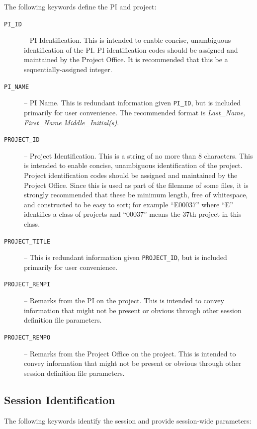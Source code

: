 The following keywords define the PI and project:

\begin{description}
\item[\texttt{PI\_ID}] -- PI Identification.  This is intended to enable concise, unambiguous identification of the PI.  PI identification codes should be assigned and maintained by the Project Office.  It is recommended that this be a sequentially-assigned integer.

\item[\texttt{PI\_NAME}] -- PI Name.  This is redundant information given \texttt{PI\_ID}, but is included primarily for user convenience.  The recommended format is \textit{Last\_Name, First\_Name Middle\_Initial(s)}.

\item[\texttt{PROJECT\_ID}] -- Project Identification.  This is a string of no more than 8 characters.  This is intended to enable concise, unambiguous identification of the project.  Project identification codes should be assigned and maintained by the Project Office.  Since this is used as part of the filename of some files, it is strongly recommended that these be minimum length, free of whitespace, and constructed to be easy to sort; for example ``E00037'' where ``E'' identifies a class of projects and ``00037'' means the 37th project in this class.

\item[\texttt{PROJECT\_TITLE}] -- This is redundant information given \texttt{PROJECT\_ID}, but is included primarily for user convenience.

\item[\texttt{PROJECT\_REMPI}] -- Remarks from the PI on the project.  This is intended to convey information that might not be present or obvious through other session definition file parameters.

\item[\texttt{PROJECT\_REMPO}] -- Remarks from the Project Office on the project.  This is intended to convey information that might not be present or obvious through other session definition file parameters.
\end{description}

\subsection{Session Identification}

The following keywords identify the session and provide session-wide parameters:

